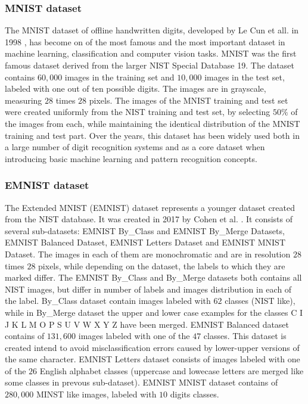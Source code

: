 \documentclass[eng]{simposium}
\begin{document}
\subsubsection{MNIST dataset}

The MNIST dataset of offline handwritten digits, developed by Le Cun et all. in 1998 \cite{8}, has become on of the most famous and the most important dataset in machine learning, 
classification and computer vision tasks. 
MNIST was the first famous dataset derived from the larger NIST Special Database 19. 
The dataset contains $60,000$ images in the training set and $10,000$ images in the test set, labeled with one out of ten possible digits. 
The images are in grayscale, measuring $28$ times $28$ pixels. 
The images of the MNIST training and test set were created uniformly from the NIST training and test set, 
by selecting $50\%$ of the images from each, while maintaining the identical distribution of the MNIST training and test part. 
Over the years, this dataset has been widely used both in a large number of digit recognition systems and as a core dataset 
when introducing basic machine learning and pattern recognition concepts. 

\subsubsection{EMNIST dataset}

The Extended MNIST (EMNIST) dataset represents a younger dataset created from the NIST database. 
It was created in 2017 by Cohen et al. \cite{1}. 
It consists of several sub-datasets: EMNIST By\_Class and EMNIST By\_Merge Datasets, EMNIST Balanced Dataset, 
EMNIST Letters Dataset and EMNIST MNIST Dataset. 
The images in each of them are monochromatic and are in resolution $28$ times $28$ pixels, 
while depending on the dataset, the labels to which they are marked differ. 
The EMNIST By\_Class and By\_Merge datasets both contains all NIST images, but differ in number of labels and images distribution 
in each of the label. By\_Class dataset contain images labeled with $62$ classes (NIST like), while in By\_Merge dataset 
the upper and lower case examples for the classes C I J K L M O P S U V W X Y Z have been merged. 
EMNIST Balanced dataset contains of $131,600$ images labeled with one of the $47$ classes. 
This dataset is created intend to avoid misclassification errors caused by lower-upper versions of the same character. 
EMNIST Letters dataset consists of images labeled with one of the $26$ English alphabet classes 
(uppercase and lowecase letters are merged like some classes in prevous sub-dataset). 
EMNIST MNIST dataset contains of $280,000$ MINST like images, labeled with $10$ digits classes. 
\end{document}
